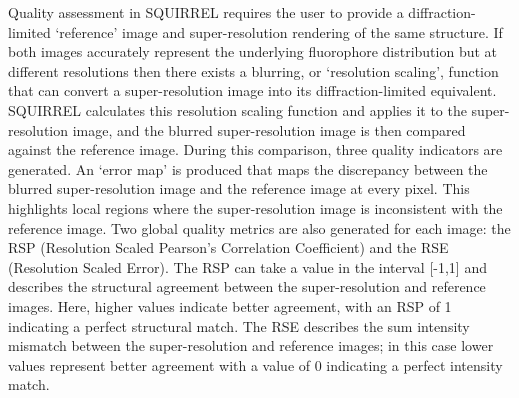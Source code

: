 Quality assessment in SQUIRREL requires the user to provide a diffraction-limited `reference’ image and super-resolution rendering of the same structure. If both images accurately represent the underlying fluorophore distribution but at different resolutions then there exists a blurring, or `resolution scaling’, function that can convert a super-resolution image into its diffraction-limited equivalent. SQUIRREL calculates this resolution scaling function and applies it to the super-resolution image, and the blurred super-resolution image is then compared against the reference image. During this comparison, three quality indicators are generated. An `error map’ is produced that maps the discrepancy between the blurred super-resolution image and the reference image at every pixel. This highlights local regions where the super-resolution image is inconsistent with the reference image. Two global quality metrics are also generated for each image: the RSP (Resolution Scaled Pearson’s Correlation Coefficient) and the RSE (Resolution Scaled Error). The RSP can take a value in the interval [-1,1] and describes the structural agreement between the super-resolution and reference images. Here, higher values indicate better agreement, with an RSP of 1 indicating a perfect structural match. The RSE describes the sum intensity mismatch between the super-resolution and reference images; in this case lower values represent better agreement with a value of 0 indicating a perfect intensity match.

